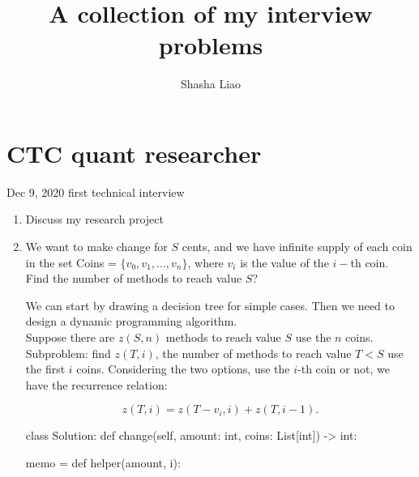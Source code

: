 \documentclass[twoside,12pt]{article}
\begin{document}
\title{A collection of my interview problems}
\author {Shasha Liao}
\maketitle
\section{CTC quant researcher}
Dec 9, 2020 first technical interview
\begin{enumerate}
\item Discuss my research project
\item We want to make change for $S$ cents, and we have infinite supply of each coin in the set Coins = $\{v_0, v_1, ..., v_n\}$, where $v_i$ is the value of the $i-$th coin. Find the number of methods to reach value $S$?
\begin{tcolorbox}
We can start by drawing a decision tree for simple cases. Then we need to design a dynamic programming algorithm. \\
Suppose there are $z(S,n)$ methods to reach value $S$ use the $n$ coins.\\

Subproblem: find $z(T,i)$, the number of methods to reach value $T < S$ use the first $i$ coins. Considering the two options, use the $i$-th coin or not, we have the recurrence relation: 

$$z(T,i) = z(T-v_i, i) + z(T, i-1).$$ 


\begin{python}
class Solution:
    def change(self, amount: int, coins: List[int]) -> int:
        
        memo = {}
        def helper(amount, i):
            

\end{python}
\end{tcolorbox}
\end{enumerate}
\end{document}
